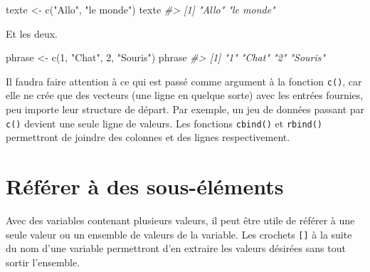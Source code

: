 \documentclass[
]{book}
\newenvironment{Shaded}{}{}
\newcommand{\CommentTok}[1]{\textit{#1}}
\newcommand{\DecValTok}[1]{#1}
\newcommand{\FunctionTok}[1]{#1}
\newcommand{\NormalTok}[1]{#1}
\newcommand{\OtherTok}[1]{#1}
\newcommand{\StringTok}[1]{#1}
\begin{document}
\begin{Shaded}
\begin{Highlighting}[]
\NormalTok{texte }\OtherTok{\textless{}{-}} \FunctionTok{c}\NormalTok{(}\StringTok{"Allo"}\NormalTok{, }\StringTok{"le monde"}\NormalTok{)}
\NormalTok{texte}
\CommentTok{\#\textgreater{} [1] "Allo"     "le monde"}
\end{Highlighting}
\end{Shaded}

Et les deux.

\begin{Shaded}
\begin{Highlighting}[]
\NormalTok{phrase }\OtherTok{\textless{}{-}} \FunctionTok{c}\NormalTok{(}\DecValTok{1}\NormalTok{, }\StringTok{"Chat"}\NormalTok{, }\DecValTok{2}\NormalTok{, }\StringTok{"Souris"}\NormalTok{)}
\NormalTok{phrase}
\CommentTok{\#\textgreater{} [1] "1"      "Chat"   "2"      "Souris"}
\end{Highlighting}
\end{Shaded}

Il faudra faire attention à ce qui est passé comme argument à la fonction \texttt{c()}, car elle ne crée que des vecteurs (une ligne en quelque sorte) avec les entrées fournies, peu importe leur structure de départ. Par exemple, un jeu de données passant par \texttt{c()} devient une seule ligne de valeurs. Les fonctions \texttt{cbind()} et \texttt{rbind()} permettront de joindre des colonnes et des lignes respectivement.

\hypertarget{ruxe9fuxe9rer-uxe0-des-sous-uxe9luxe9ments}{%
\section{Référer à des sous-éléments}\label{ruxe9fuxe9rer-uxe0-des-sous-uxe9luxe9ments}}

Avec des variables contenant plusieurs valeurs, il peut être utile de référer à une seule valeur ou un ensemble de valeurs de la variable. Les crochets \texttt{{[}{]}} à la suite du nom d'une variable permettront d'en extraire les valeurs désirées sans tout sortir l'ensemble.
\end{document}
